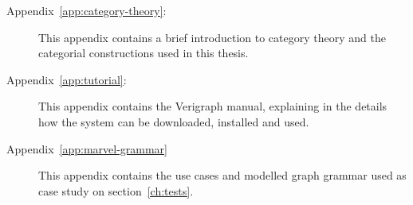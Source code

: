 \begin{description}
  \item[Appendix~\ref{app:category-theory}:] This appendix contains a brief introduction to category theory and the categorial constructions used in this thesis.

  \item[Appendix~\ref{app:tutorial}:] This appendix contains the Verigraph manual, explaining in the details how the system can be downloaded, installed and used.

  \item[Appendix~\ref{app:marvel-grammar}] This appendix contains the use cases and modelled graph grammar used as case study on section~\ref{ch:tests}.
\end{description}
